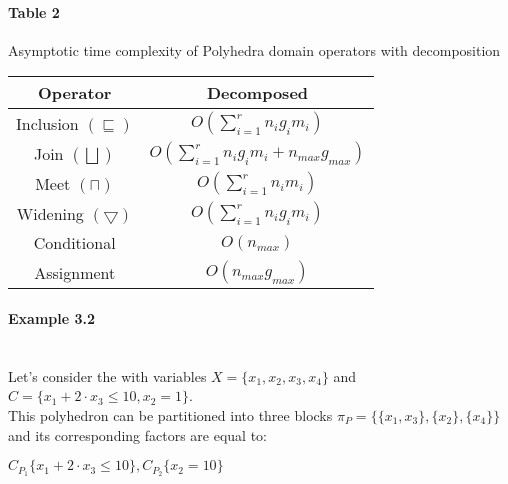 \paragraph{Table 2} Asymptotic time complexity of Polyhedra domain operators with decomposition

\begin{center}
\begin{tabular}{||c c||} 
 
 \hline
 Operator & Decomposed  \\ [0.5ex] 
 \hline
 Inclusion $(\sqsubseteq)$ & $O(\sum_{i=1}^r n_ig_im_i)$\\ 
 \hline
 Join $(\bigsqcup)$ & $O(\sum_{i=1}^r n_i g_i m_i + n_{max} g_{max})$ \\
 \hline
 Meet $(\sqcap)$ & $O(\sum_{i=1}^r n_i m_i)$ \\
 \hline
 Widening $(\bigtriangledown)$ & $O(\sum_{i=1}^r n_i g_i m_i)$\\
 \hline
 Conditional & $O(n_{max})$ \\ 
 \hline
 Assignment & $O(n_{max}g_{max})$ \\ 
 
 
 \hline
\end{tabular}
\end{center}

 
\paragraph{Example 3.2} \mbox{}\\
Let's consider the with variables $X = \{x_1,x_2,x_3,x_4\}$ and $C = \{ x_1 + 2 \cdot x_3 \leq 10, x_2 = 1 \}$.\\
This polyhedron can be partitioned into three blocks $\pi_P = \{\{x_1,x_3\},\{x_2\},\{x_4\}\}$ and its corresponding factors are equal to:
\begin{center}
	$C_{P_1}\{x_1 + 2\cdot x_3 \leq 10 \} , C_{P_2}\{x_2 = 10 \}$
\end{center}


